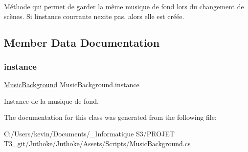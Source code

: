 Méthode qui permet de garder la même musique de fond lors du changement de scènes. Si l\textquotesingle{}instance courrante n\textquotesingle{}exite pas, alors elle est créée. 

\subsection{Member Data Documentation}
\mbox{\label{class_music_background_a8b829bcb5dbedc2263738689ffb80abc}} 
\subsubsection{\texorpdfstring{instance}{instance}}
{\footnotesize\ttfamily \mbox{\hyperlink{class_music_background}{Music\+Background}} Music\+Background.\+instance\hspace{0.3cm}{\ttfamily [static]}}

Instance de la musique de fond. 

The documentation for this class was generated from the following file\+:\begin{DoxyCompactItemize}
\item 
C\+:/\+Users/kevin/\+Documents/\+\_\+\+Informatique S3/\+P\+R\+O\+J\+E\+T T3\+\_\+git/\+Juthoke/\+Juthoke/\+Assets/\+Scripts/Music\+Background.\+cs\end{DoxyCompactItemize}
